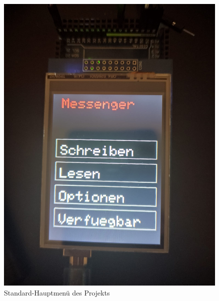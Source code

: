 \documentclass[a4paper, 11pt]{scrartcl}
\begin{document}
\begin{small}
\begin{figure}[H]
    \begin{center}
        \includegraphics[scale=0.13]{Bilder/MainMenu_standard.jpeg}
        \caption{Standard-Hauptmenü des Projekts}\label{pic:main_standard}
    \end{center}
\end{figure}


\end{small}
\end{document}
